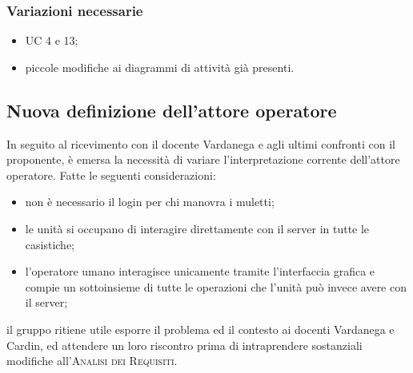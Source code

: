     \subsubsection{Variazioni necessarie}
    \begin{itemize}
        \item UC 4 e 13;
        \item piccole modifiche ai diagrammi di attività già presenti.
    \end{itemize}

\subsection{Nuova definizione dell'attore operatore}
    In seguito al ricevimento con il docente Vardanega e agli ultimi confronti con il proponente, è emersa la necessità di variare l'interpretazione corrente dell'attore operatore. Fatte le seguenti considerazioni:
    \begin{itemize}
        \item non è necessario il login per chi manovra i muletti;
        \item le unità si occupano di interagire direttamente con il server in tutte le casistiche;
        \item l'operatore umano interagisce unicamente tramite l'interfaccia grafica e compie un sottoinsieme di tutte le operazioni che l'unità può invece avere con il server;
    \end{itemize}
    il gruppo ritiene utile esporre il problema ed il contesto ai docenti Vardanega e Cardin, ed attendere un loro riscontro prima di intraprendere sostanziali modifiche all'\textsc{Analisi dei Requisiti}.

